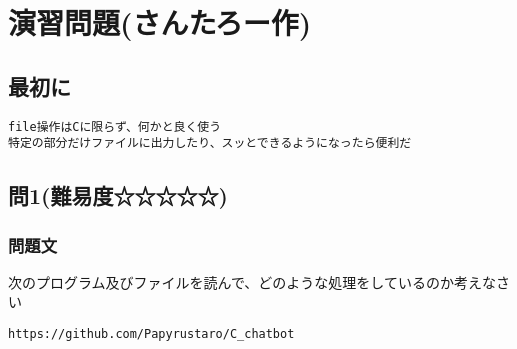 \section{演習問題(さんたろー作)}
\subsection{最初に}
\begin{verbatim}
file操作はCに限らず、何かと良く使う
特定の部分だけファイルに出力したり、スッとできるようになったら便利だ

\end{verbatim}
\subsection{問1(難易度☆☆☆☆☆)}
\subsubsection{問題文}
次のプログラム及びファイルを読んで、どのような処理をしているのか考えなさい\\
\begin{verbatim}
https://github.com/Papyrustaro/C_chatbot
\end{verbatim}
